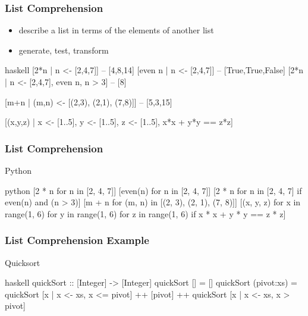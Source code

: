 \documentclass[dvipsnames]{beamer}
\theoremstyle{plain}
\begin{document}
\begin{frame}[fragile]
  \frametitle{List Comprehension}

  \begin{itemize}
    \item describe a list in terms of the elements of another list
    \item generate, test, transform
  \end{itemize}

  \begin{exampleblock}{}
    \begin{pygments}{haskell}
[2*n | n <- [2,4,7]]              -- [4,8,14]
[even n | n <- [2,4,7]]           -- [True,True,False]
[2*n | n <- [2,4,7], even n, n > 3] -- [8]

[m+n | (m,n) <- [(2,3), (2,1), (7,8)]] -- [5,3,15]

[(x,y,z) | x <- [1..5], y <- [1..5], z <- [1..5],
           x*x + y*y == z*z]
    \end{pygments}
  \end{exampleblock}
\end{frame}

\begin{frame}[fragile]
  \frametitle{List Comprehension}

  \begin{exampleblock}{Python}
    \begin{pygments}{python}
[2 * n for n in [2, 4, 7]]
[even(n) for n in [2, 4, 7]]
[2 * n for n in [2, 4, 7] if even(n) and (n > 3)]
[m + n for (m, n) in [(2, 3), (2, 1), (7, 8)]]
[(x, y, z) for x in range(1, 6)
           for y in range(1, 6)
           for z in range(1, 6)
           if x * x + y * y == z * z]
    \end{pygments}
  \end{exampleblock}
\end{frame}

\begin{frame}[fragile]
  \frametitle{List Comprehension Example}

  \begin{exampleblock}{Quicksort}
    \begin{pygments}{haskell}
quickSort :: [Integer] -> [Integer]
quickSort []         = []
quickSort (pivot:xs) =
    quickSort [x | x <- xs, x <= pivot]
    ++ [pivot]
    ++ quickSort [x | x <- xs, x > pivot]
    \end{pygments}
  \end{exampleblock}
\end{frame}
\end{document}
